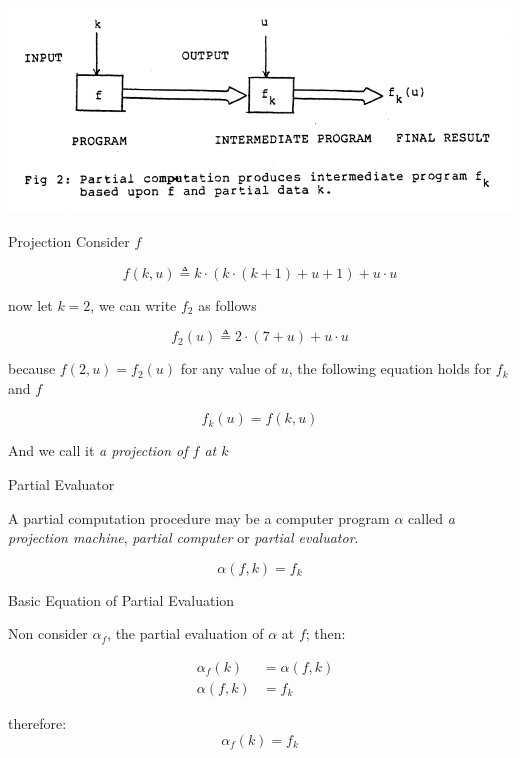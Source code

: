 \documentclass[aspectratio=169]{beamer}
\begin{document}
\begin{frame}

    \includegraphics[width=\textwidth]{imgs/fig2.png}

\end{frame}
 
\begin{frame}{Projection}
Consider $f$

    \[
        f(k,u) \triangleq k \cdot ( k \cdot (k+1) + u + 1) + u\cdot u
    \]

now let $k=2$, we can write $f_2$ as follows

    \[
        f_2(u) \triangleq 2 \cdot (7+u) + u\cdot u    
    \]

because $f(2,u) = f_2(u)$ for any value of $u$, 
the following equation holds for $f_k$ and $f$



    \begin{equation}
        f_k(u)=f(k,u)
    \end{equation}

And we call it \textit{a projection of $f$ at $k$}

\end{frame}

\begin{frame}{Partial Evaluator}

A partial computation procedure may be a computer program $\alpha$
called \textit{a projection machine}, \textit{partial computer} 
or \textit{partial evaluator}.

\begin{equation}
    \alpha(f,k) = f_k
\end{equation}
\end{frame}


\begin{frame}{Basic Equation of Partial Evaluation}

Non consider $\alpha_f$, the partial evaluation of $\alpha$ at $f$; then:

\begin{eqnarray*}
            &\alpha_f(k) &= \alpha(f,k)\\
            &\alpha(f,k) &= f_k
\end{eqnarray*}

therefore:
\begin{equation}
       \alpha_f(k) =f_k 
\end{equation}
\end{frame}
\end{document}
